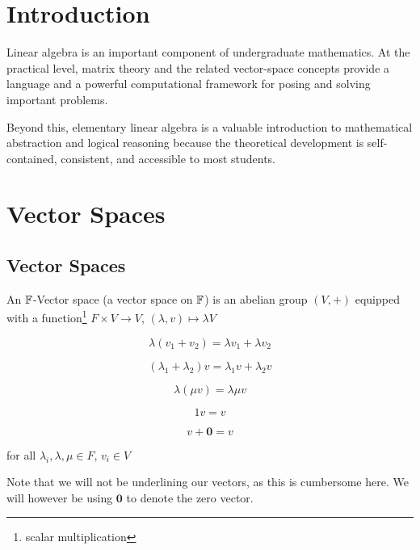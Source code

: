 \documentclass[a4paper]{article}
\begin{document}
\maketitle

\setcounter{section}{-1}
\section{Introduction}

   Linear algebra is an important component of undergraduate mathematics. At the practical level, matrix theory and the related vector-space concepts provide a language and a powerful computational framework for posing and solving important problems. 




Beyond this, elementary linear algebra is a valuable introduction to mathematical abstraction and logical reasoning because the theoretical development is self-contained, consistent, and accessible to most students.



\section{Vector Spaces}
\subsection{Vector Spaces}

\begin{defi}
	An $ \mathbb{F} $-Vector space (a vector space on $ \mathbb{F} $) is an abelian group $ (V, +) $ equipped with a function\footnote{scalar multiplication} $ F \times V \to V $, $ (\lambda,v) \mapsto \lambda V $
	
	\[ \lambda ( v_{1} + v_{2}) = \lambda v_{1} + \lambda v_{2} \]
	
	\[ (\lambda_{1} + \lambda_{2}) v = \lambda_{1} v + \lambda_{2} v \]
	
	\[ \lambda (\mu v) = \lambda \mu v \]
	
	\[ 1v = v \]
	
	\[ v + \mathbf{0} = v \]
	
	for all $ \lambda_{i}, \lambda, \mu \in F $, $ v_{i} \in V $
	
\end{defi}

Note that we will not be underlining our vectors, as this is cumbersome here. We will however be using $ \mathbf{0} $ to denote the zero vector. 
\end{document}
